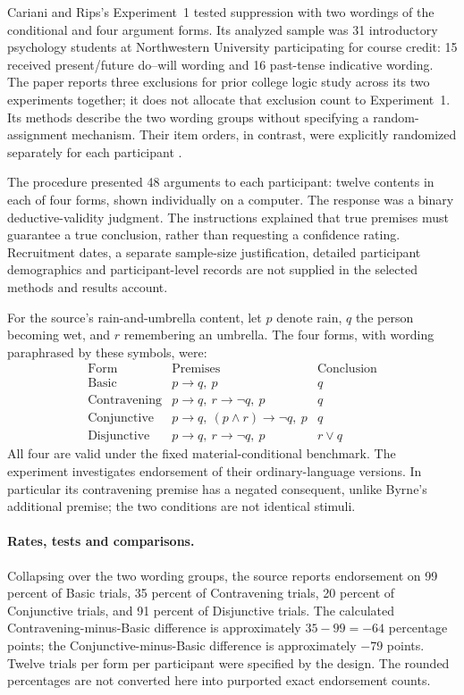 Cariani and Rips's Experiment~1 tested suppression with two wordings of
the conditional and four argument forms. Its analyzed sample was 31
introductory psychology students at Northwestern University participating
for course credit: 15 received present/future do--will wording and 16
past-tense indicative wording. The paper reports three exclusions for
prior college logic study across its two experiments together; it does
not allocate that exclusion count to Experiment~1. Its methods describe
the two wording groups without specifying a random-assignment mechanism.
Their item orders, in contrast, were explicitly randomized separately
for each participant \cite[Sec.~2.3]{CarianiRips2017Suppression}.

The procedure presented 48 arguments to each participant: twelve
contents in each of four forms, shown individually on a computer.
The response was a binary deductive-validity judgment. The instructions
explained that true premises must guarantee a true conclusion, rather
than requesting a confidence rating. Recruitment dates, a separate
sample-size justification, detailed participant demographics and
participant-level records are not supplied in the selected methods
and results account.

For the source's rain-and-umbrella content, let \(p\) denote rain,
\(q\) the person becoming wet, and \(r\) remembering an umbrella.
The four forms, with wording paraphrased by these symbols, were:
\[
\begin{array}{l|l|l}
 \text{Form}&\text{Premises}&\text{Conclusion}\\\hline
 \text{Basic}&p\to q,\ p&q\\
 \text{Contravening}&p\to q,\ r\to\neg q,\ p&q\\
 \text{Conjunctive}&p\to q,\ (p\land r)\to\neg q,\ p&q\\
 \text{Disjunctive}&p\to q,\ r\to\neg q,\ p&r\lor q
\end{array}
\]
All four are valid under the fixed material-conditional benchmark. The
experiment investigates endorsement of their ordinary-language versions.
In particular its contravening premise has a negated consequent, unlike
Byrne's additional premise; the two conditions are not identical stimuli.

\paragraph{Rates, tests and comparisons.}
Collapsing over the two wording groups, the source reports endorsement
on 99 percent of Basic trials, 35 percent of Contravening trials,
20 percent of Conjunctive trials, and 91 percent of Disjunctive trials.
The calculated Contravening-minus-Basic difference is approximately
\(35-99=-64\) percentage points; the Conjunctive-minus-Basic difference
is approximately \(-79\) points. Twelve trials per form per participant
were specified by the design. The rounded percentages are not converted
here into purported exact endorsement counts.

